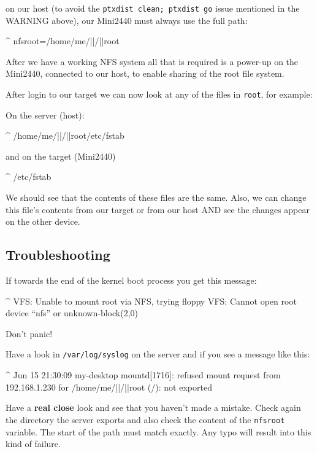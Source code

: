 on our host (to avoid the \texttt{ptxdist clean; ptxdist go} issue mentioned
in the WARNING above), our Mini2440 must always use the full path:

\begin{ptxshell}[escapechar=|]{^}
nfsroot=/home/me/|\ptxdistBSPName |/|\ptxdistPlatformDir |root
\end{ptxshell}

After we have a working NFS system all that is required is a power-up on the
Mini2440, connected to our host, to enable sharing of the root file system.

After login to our target we can now look at any of the files in
\texttt{\ptxdistPlatformDir root}, for example:

On the server (host):

\begin{ptxshell}[escapechar=|]{^}
/home/me/|\ptxdistBSPName |/|\ptxdistPlatformDir |root/etc/fstab
\end{ptxshell}

and on the target (Mini2440)

\begin{ptxshell}[escapechar=|]{^}
/etc/fstab
\end{ptxshell}

We should see that the contents of these files are the same. Also, we can
change this file’s contents from our target or from our host AND see the
changes appear on the other device.

\subsection{Troubleshooting}

If towards the end of the kernel boot process you get this message:

\begin{ptxshell}[escapechar=|]{^}
VFS:  Unable to mount root via NFS, trying floppy
VFS:  Cannot open root device “nfs” or unknown-block(2,0)
\end{ptxshell}

Don’t panic!

Have a look in \texttt{/var/log/syslog} on the server and if you see a
message like this:

\begin{ptxshell}[escapechar=|]{^}
Jun 15 21:30:09 my-desktop mountd[1716]: refused mount request from 192.168.1.230 for
/home/me/|\ptxdistBSPName |/|\ptxdistPlatformDir |root (/): not exported
\end{ptxshell}

Have a \textbf{real close} look and see that you haven’t made a mistake. Check
again the directory the server exports and also check the content of the \texttt{nfsroot}
variable. The start of the path must match exactly. Any typo will result into this
kind of failure.
